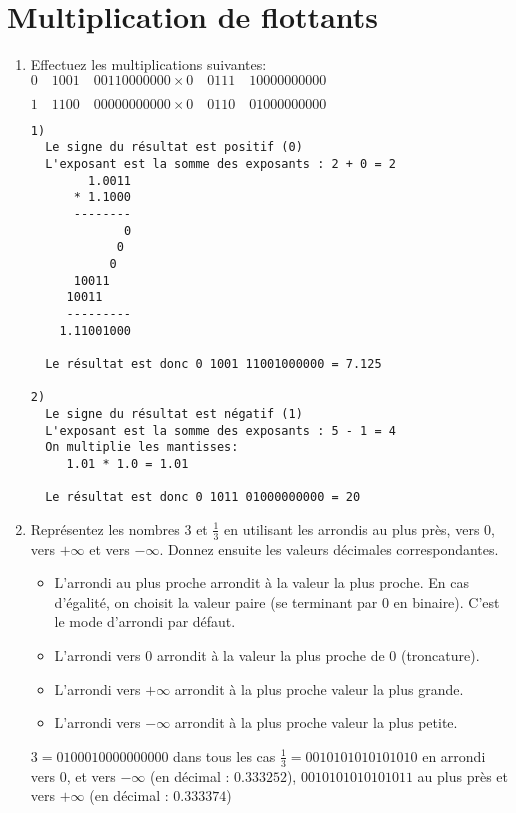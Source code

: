 \documentclass[a4paper,10pt]{exam}
\begin{document}
\section{Multiplication de flottants}
\begin{enumerate}
\item Effectuez les multiplications suivantes:\\
$0\quad 1001\quad 00110000000 \times 0\quad  0111\quad  10000000000$

$1\quad 1100\quad 00000000000 \times 0\quad  0110\quad  01000000000$
\begin{solution}
\begin{verbatim}
1)
  Le signe du résultat est positif (0)
  L'exposant est la somme des exposants : 2 + 0 = 2
        1.0011
      * 1.1000
      --------
             0
            0
           0
      10011
     10011
     ---------
    1.11001000

  Le résultat est donc 0 1001 11001000000 = 7.125

2)
  Le signe du résultat est négatif (1)
  L'exposant est la somme des exposants : 5 - 1 = 4
  On multiplie les mantisses:
     1.01 * 1.0 = 1.01

  Le résultat est donc 0 1011 01000000000 = 20
\end{verbatim}

\end{solution}

\item Repr\'esentez les nombres $3$ et $\frac{1}{3}$ en utilisant les arrondis
  au plus pr\`es, vers 0, vers $+\infty$ et vers $-\infty$. Donnez ensuite les valeurs d\'ecimales correspondantes.

\begin{solution}
\begin{itemize}
\item L'arrondi au plus proche arrondit \`a la valeur la plus proche. En cas d'\'egalit\'e, on choisit la valeur paire (se terminant par 0 en binaire). C'est le mode d'arrondi par d\'efaut.
\item L'arrondi vers 0 arrondit \`a la valeur la plus proche de 0 (troncature).
\item L'arrondi vers $+\infty$ arrondit \`a la plus proche valeur la plus grande.
\item L'arrondi vers $-\infty$ arrondit \`a la plus proche valeur la plus petite.

\end{itemize}
$3 = 0 1000 10000000000$ dans tous les cas
$\frac{1}{3} = 0 0101 01010101010$ en arrondi vers 0, et vers $-\infty$ (en
d\'ecimal : $0.333252$), $0 0101 01010101011$  au plus pr\`es et vers $+\infty$ (en d\'ecimal : $0.333374$)
\end{solution}


\end{enumerate}
\end{document}
